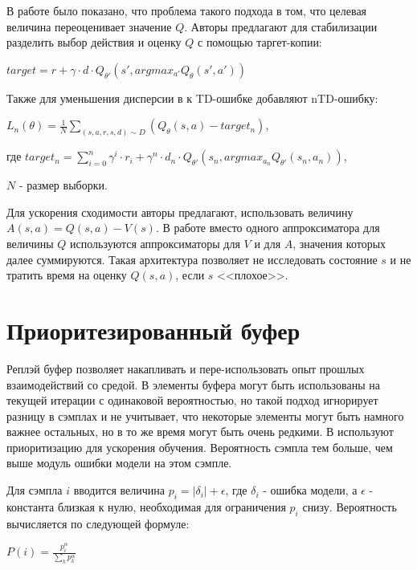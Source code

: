 \documentclass{mipt-thesis-bs}
\begin{document}
В работе \cite{double dqn} было показано, что проблема такого подхода в том, что целевая величина переоценивает значение $Q$. Авторы предлагают для стабилизации разделить выбор действия и оценку $Q$ с помощью таргет-копии:

\begin{center}
$target = r + \gamma\cdot d \cdot Q_{\theta'}(s',argmax_{a'}Q_{\theta}(s',a'))$ 
\end{center}

Также для уменьшения дисперсии в \cite{n-step} к TD-ошибке добавляют nTD-ошибку:

\begin{center}
$L_n(\theta)=\frac{1}{N}\sum_{(s,a,r,s,d) \sim D} (Q_\theta(s, a) - target_n)$,

где $target_n = \sum_{i=0}^{n}\gamma^i\cdot r_i + \gamma^n\cdot d_n \cdot Q_{\theta'}(s_n,argmax_{a_n}Q_{\theta'}(s_n,a_n))$,

$N$ - размер выборки.
\end{center}

Для ускорения сходимости авторы \cite{dueling dqn} предлагают, использовать величину $A(s,a)=Q(s,a) - V(s)$. 
В работе вместо одного аппроксиматора для величины $Q$ используются аппроксиматоры для $V$ и для $A$, значения которых далее суммируются. Такая архитектура позволяет не исследовать состояние $s$ и не тратить время на оценку $Q(s,a)$, если $s$ <<плохое>>.

\section{Приоритезированный буфер}

Реплэй буфер позволяет накапливать и пере-использовать опыт прошлых взаимодействий со средой. В \cite{dqn} элементы буфера могут быть использованы на текущей итерации с одинаковой вероятностью, но такой подход игнорирует разницу в сэмплах и не учитывает, что некоторые элементы могут быть намного важнее остальных, но в то же время могут быть очень редкими. В \cite{per} используют приоритизацию для ускорения обучения. Вероятность сэмпла тем больше, чем выше модуль ошибки модели на этом сэмпле.

Для сэмпла $i$ вводится величина $p_i=|\delta_i| + \epsilon$, где $\delta_i$ - ошибка модели, а $\epsilon$ - константа близкая к нулю, необходимая для ограничения $p_i$ снизу. Вероятность вычисляется по следующей формуле:

\begin{center}
    $P(i)=\frac{p_{i}^{\alpha}}{\sum_{k} p_{k}^{\alpha}}$
\end{center}
\end{document}
